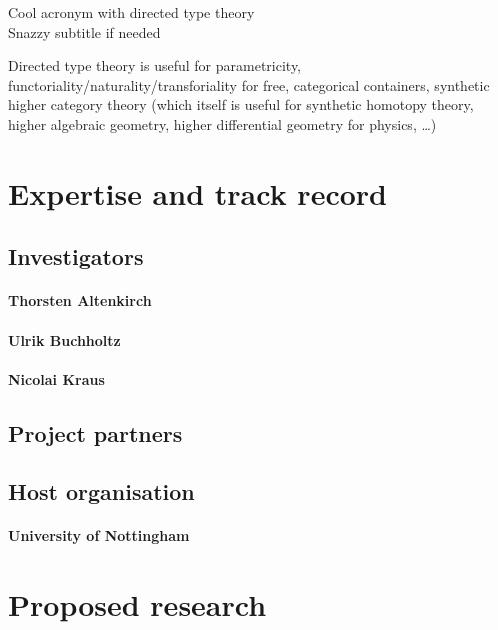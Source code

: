 \documentclass[a4paper,11pt]{article}
\begin{document}
\begin{center}
  \Huge Cool acronym with directed type theory\\[5pt]
  \Large Snazzy subtitle if needed
\end{center}

\noindent Directed type theory is useful for parametricity, functoriality/naturality/transforiality for free, categorical containers, synthetic higher category theory (which itself is useful for synthetic homotopy theory, higher algebraic geometry, higher differential geometry for physics, \ldots)

\section{Expertise and track record}

\subsection{Investigators}

\paragraph{Thorsten Altenkirch}

\paragraph{Ulrik Buchholtz}

\paragraph{Nicolai Kraus}

\subsection{Project partners}

\subsection{Host organisation}

\paragraph{University of Nottingham}

\section{Proposed research}
\end{document}
